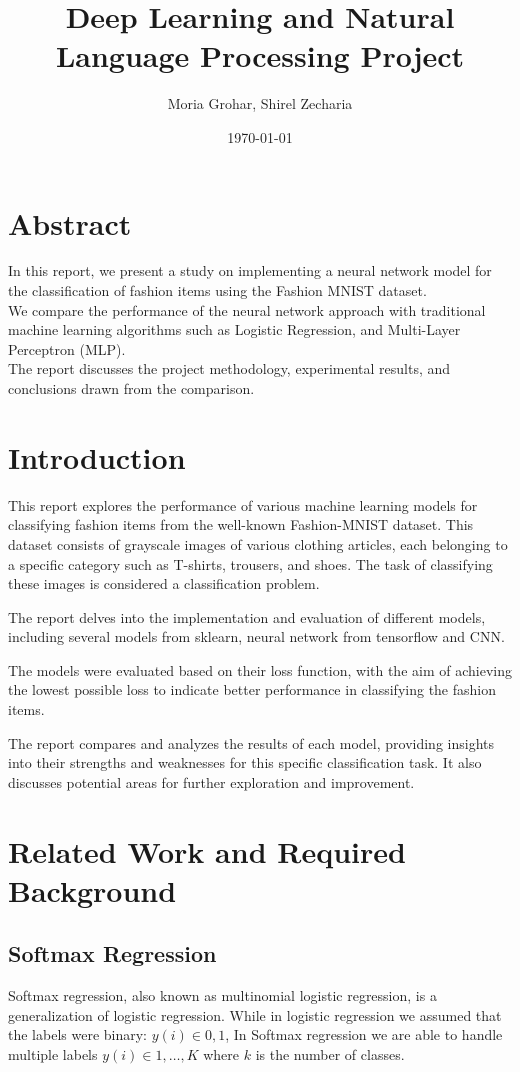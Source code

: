 \documentclass{article}
\title{Deep Learning and Natural Language Processing Project}
\author{Moria Grohar, Shirel Zecharia}
\date{\today}
\begin{document}
\maketitle
\tableofcontents
\newpage

\section{Abstract}
In this report, we present a study on implementing a neural network model for the classification of fashion items using the Fashion MNIST dataset.\\
We compare the performance of the neural network approach with traditional machine learning algorithms such as Logistic Regression, and Multi-Layer Perceptron (MLP).\\
The report discusses the project methodology, experimental results, and conclusions drawn from the comparison.

\section{Introduction}
This report explores the performance of various machine learning models for classifying fashion items from the well-known Fashion-MNIST dataset. This dataset consists of grayscale images of various clothing articles, each belonging to a specific category such as T-shirts, trousers, and shoes. The task of classifying these images is considered a classification problem.

The report delves into the implementation and evaluation of different models,
including several models from sklearn, neural network from tensorflow and CNN.

The models were evaluated based on their loss function, with the aim of achieving the lowest possible loss to indicate better performance in classifying the fashion items.

The report compares and analyzes the results of each model, providing insights into their strengths and weaknesses for this specific classification task. It also discusses potential areas for further exploration and improvement.

\section{Related Work and Required Background}
\subsection{Softmax Regression}
Softmax regression, also known as multinomial logistic regression, is a generalization of logistic regression.
While in logistic regression we assumed that the labels were binary: ${y(i)\in{0,1}}$, In Softmax regression we are able to handle multiple labels ${y(i)\in{1,…,K}}$ where ${k}$ is the number of classes.\\
\end{document}
